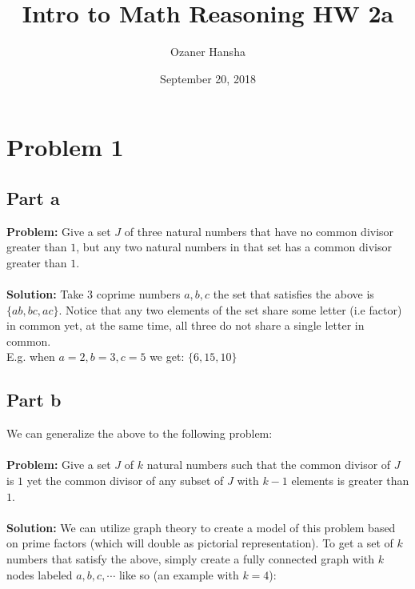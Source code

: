 \documentclass{article}
\begin{document}
\title{Intro to Math Reasoning HW 2a}
\author{Ozaner Hansha}
\date{September 20, 2018}
\maketitle

\section{Problem 1}
\subsection{Part a}
\textbf{Problem:} Give a set $J$ of three natural numbers that have no common divisor greater than $1$, but any two natural numbers in that set has a common divisor greater than $1$.
\\\\
\textbf{Solution:} Take 3 coprime numbers $a,b,c$ the set that satisfies the above is $\{ab,bc,ac\}$. Notice that any two elements of the set share some letter (i.e factor) in common yet, at the same time, all three do not share a single letter in common.
\\

E.g. when $a=2,b=3,c=5$ we get: $\{6,15,10\}$

\subsection{Part b}
We can generalize the above to the following problem:
\\\\
\textbf{Problem:} Give a set $J$ of $k$ natural numbers such that the common divisor of $J$ is $1$ yet the common divisor of any subset of $J$ with $k-1$ elements is greater than $1$.
\\\\
\textbf{Solution:} We can utilize graph theory to create a model of this problem based on prime factors (which will double as pictorial representation). To get a set of $k$ numbers that satisfy the above, simply create a fully connected graph with $k$ nodes labeled $a,b,c,\cdots$ like so (an example with $k=4$):

\begin{center}
\end{center}
\end{document}
